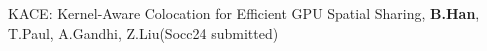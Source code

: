 \begin{zitemize}
    \item KACE: Kernel-Aware Colocation for Efficient GPU Spatial Sharing, \textbf{B.Han}, T.Paul, A.Gandhi, Z.Liu(Socc24 submitted)
\end{zitemize}